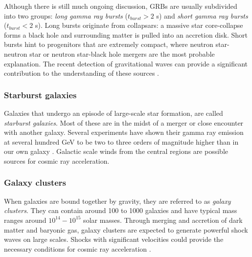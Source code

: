 \noindent Although there is still much ongoing discussion, GRBs are usually subdivided into two groups: \textit{long gamma ray bursts} ($t_{burst} > 2$ s) and \textit{short gamma ray bursts} ($t_{burst} < 2$ s). Long bursts originate from collapsars: a massive star core-collapse forms a black hole and surrounding matter is pulled into an accretion disk. Short bursts hint to progenitors that are extremely compact, where neutron star-neutron star or neutron star-black hole mergers are the most probable explanation. The recent detection of gravitational waves can provide a significant contribution to the understanding of these sources \cite{TheLIGOScientific:2017qsa,Abbott:2017oio,Abbott:2017gyy,Abbott:2017vtc,Abbott:2016nmj}.


\subsubsection{Starburst galaxies}
Galaxies that undergo an episode of large-scale star formation, are called \textit{starburst galaxies}. Most of these are in the midst of a merger or close encounter with another galaxy. Several experiments have shown their gamma ray emission at several hundred GeV to be two to three orders of magnitude higher than in our own galaxy \cite{Acero:2009nb,Karlsson:2009hd}. Galactic scale winds from the central regions are possible sources for cosmic ray acceleration.

\subsubsection{Galaxy clusters}
When galaxies are bound together by gravity, they are referred to as \textit{galaxy clusters}. They can contain around 100 to 1000 galaxies and have typical mass ranges around $10^{14}-10^{15}$ solar masses. Through merging and accretion of dark matter and baryonic gas, galaxy clusters are expected to generate powerful shock waves on large scales. Shocks with significant velocities could provide the necessary conditions for cosmic ray acceleration \cite{1538-4357-689-2-L105}.

